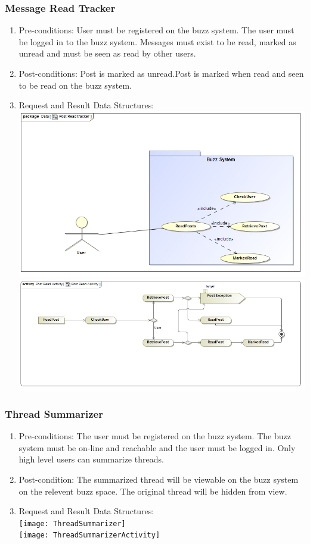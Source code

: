 \documentclass[12pt, oneside]{article}
\begin{document}
\subsubsection{Message Read Tracker}
\begin{enumerate}
 \item Pre-conditions:  User must be registered on the buzz system. The user must be logged in to the buzz system. Messages must exist to be read, marked as unread and must be seen as read by other users.
 \\
 \item Post-conditions: Post is marked as unread.Post is marked when read and seen to be read on the buzz system.
   \\
 \item Request and Result Data Structures:\\
   \includegraphics[scale=0.4]{PostReadTracker}\\
 \includegraphics[scale=0.4]{PostReadActivity} 
\end{enumerate}
\subsubsection{Thread Summarizer}
\begin{enumerate}
 \item Pre-conditions:  The user must be registered on the buzz system. The buzz system must be on-line and reachable and the user must be logged in. Only high level users can summarize threads.
 \item Post-condition:  The summarized thread will be viewable on the buzz system on the relevent buzz space. The original thread will be hidden from view.
 \\
\item Request and Result Data Structures:\\
   \texttt{[image: ThreadSummarizer]}\\
 \texttt{[image: ThreadSummarizerActivity]} 
\end{enumerate}
\end{document}
